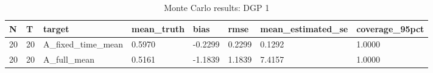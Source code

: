 \begin{table}[!htbp]
\centering
\caption{Monte Carlo results: DGP 1}
\label{tab:mc-dgp1}
\begin{tabular}{llllllll}
\toprule
N & T & target & mean\_truth & bias & rmse & mean\_estimated\_se & coverage\_95pct \\
\midrule
20 & 20 & A\_fixed\_time\_mean & 0.5970 & -0.2299 & 0.2299 & 0.1292 & 1.0000 \\
20 & 20 & A\_full\_mean & 0.5161 & -1.1839 & 1.1839 & 7.4157 & 1.0000 \\
\bottomrule
\end{tabular}
\end{table}
